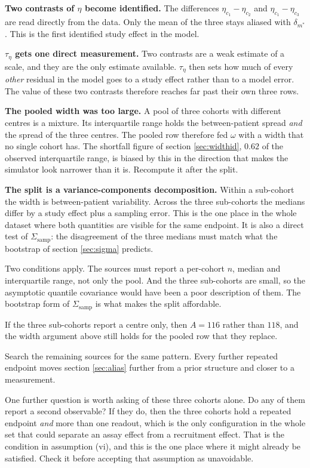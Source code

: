 \documentclass[11pt]{article}
\begin{document}
\textbf{Two contrasts of $\eta$ become identified.} The differences
$\eta_{c_1}-\eta_{c_2}$ and $\eta_{c_1}-\eta_{c_3}$ are read directly from the
data. Only the mean of the three stays aliased with $\delta_{m^\ast}$. This is
the first identified study effect in the model.

\textbf{$\tau_\eta$ gets one direct measurement.} Two contrasts are a weak
estimate of a scale, and they are the only estimate available. $\tau_\eta$ then
sets how much of every \emph{other} residual in the model goes to a study effect
rather than to a model error. The value of these two contrasts therefore reaches
far past their own three rows.

\textbf{The pooled width was too large.} A pool of three cohorts with different
centres is a mixture. Its interquartile range holds the between-patient spread
\emph{and} the spread of the three centres. The pooled row therefore fed
$\omega$ with a width that no single cohort has. The shortfall figure of section
\ref{sec:widthid}, $0.62$ of the observed interquartile range, is biased by this
in the direction that makes the simulator look narrower than it is. Recompute it
after the split.

\textbf{The split is a variance-components decomposition.} Within a sub-cohort
the width is between-patient variability. Across the three sub-cohorts the
medians differ by a study effect plus a sampling error. This is the one place in
the whole dataset where both quantities are visible for the same endpoint. It is
also a direct test of $\Sigma_{\text{samp}}$: the disagreement of the three
medians must match what the bootstrap of section \ref{sec:sigma} predicts.

Two conditions apply. The sources must report a per-cohort $n$, median and
interquartile range, not only the pool. And the three sub-cohorts are small, so
the asymptotic quantile covariance would have been a poor description of them.
The bootstrap form of $\Sigma_{\text{samp}}$ is what makes the split affordable.

If the three sub-cohorts report a centre only, then $A=116$ rather than $118$,
and the width argument above still holds for the pooled row that they replace.

Search the remaining sources for the same pattern. Every further repeated
endpoint moves section \ref{sec:alias} further from a prior structure and closer
to a measurement.

One further question is worth asking of these three cohorts alone. Do any of them
report a second observable? If they do, then the three cohorts hold a repeated
endpoint \emph{and} more than one readout, which is the only configuration in the
whole set that could separate an assay effect from a recruitment effect. That is
the condition in assumption (vi), and this is the one place where it might
already be satisfied. Check it before accepting that assumption as unavoidable.
\end{document}
